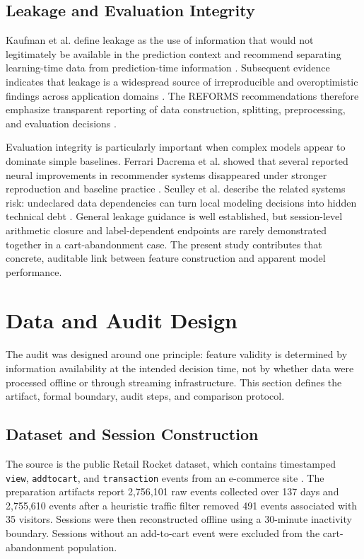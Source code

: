 \documentclass[conference, letterpaper]{IEEEtran}
\begin{document}
\subsection{Leakage and Evaluation Integrity}
Kaufman et al. define leakage as the use of information that would not legitimately be available in the prediction context and recommend separating learning-time data from prediction-time information \cite{kaufman2012}. Subsequent evidence indicates that leakage is a widespread source of irreproducible and overoptimistic findings across application domains \cite{kapoor2023}. The REFORMS recommendations therefore emphasize transparent reporting of data construction, splitting, preprocessing, and evaluation decisions \cite{reforms2024}.

Evaluation integrity is particularly important when complex models appear to dominate simple baselines. Ferrari Dacrema et al. showed that several reported neural improvements in recommender systems disappeared under stronger reproduction and baseline practice \cite{dacrema2019}. Sculley et al. describe the related systems risk: undeclared data dependencies can turn local modeling decisions into hidden technical debt \cite{sculley2015}. General leakage guidance is well established, but session-level arithmetic closure and label-dependent endpoints are rarely demonstrated together in a cart-abandonment case. The present study contributes that concrete, auditable link between feature construction and apparent model performance.

\section{Data and Audit Design}
The audit was designed around one principle: feature validity is determined by information availability at the intended decision time, not by whether data were processed offline or through streaming infrastructure. This section defines the artifact, formal boundary, audit steps, and comparison protocol.

\subsection{Dataset and Session Construction}
The source is the public Retail Rocket dataset, which contains timestamped \texttt{view}, \texttt{addtocart}, and \texttt{transaction} events from an e-commerce site \cite{retailrocket2015}. The preparation artifacts report 2,756,101 raw events collected over 137 days and 2,755,610 events after a heuristic traffic filter removed 491 events associated with 35 visitors. Sessions were then reconstructed offline using a 30-minute inactivity boundary. Sessions without an add-to-cart event were excluded from the cart-abandonment population.
\end{document}
